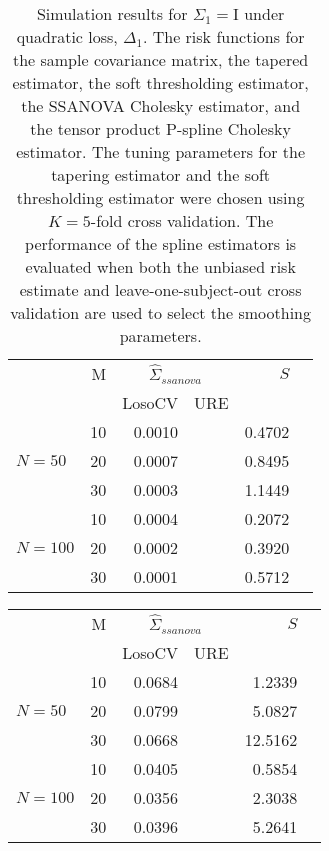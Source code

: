 \documentclass[12pt]{article}
\theoremstyle{definition}
\begin{document}
\setlength{\dashlinedash}{0.5pt}
\setlength{\dashlinegap}{1pt}
\setlength{\arrayrulewidth}{0.2pt}


\begin{table}[ht]
\caption{Simulation results for $\Sigma_1 = \mathrm{I}$ under quadratic loss, $\Delta_1$. The risk functions for the sample covariance matrix, the tapered estimator, the soft thresholding estimator, the SSANOVA Cholesky estimator, and the tensor product P-spline Cholesky estimator. The tuning parameters for the tapering estimator and the soft thresholding estimator were chosen using $K = 5$-fold cross validation. The performance of the spline estimators is evaluated when both the unbiased risk estimate and leave-one-subject-out cross validation are used to select the smoothing parameters.}
\centering
\begin{tabular}{lrrrrr}
& M & \multicolumn{2}{c}{$\hat{\Sigma}_{ssanova}$} & $S$ \\ 
& & \mbox{LosoCV} & \mbox{URE} &  \\   \hline
		&    10 & 0.0010 && 0.4702 \\ 
$N = 50$  &    20 & 0.0007 && 0.8495 \\ 
  		&    30 & 0.0003 && 1.1449 \\ \hdashline
		 &    10 & 0.0004 && 0.2072 \\ 
$N = 100$ &    20 & 0.0002 && 0.3920 \\ 
   &    30 & 0.0001 & &0.5712 \\ 
   \hline
\end{tabular}
\end{table}


\begin{table}[ht]
\centering
\begin{tabular}{lrrrrr}
& M & \multicolumn{2}{c}{$\hat{\Sigma}_{ssanova}$} & $S$ \\ 
& & \mbox{LosoCV} & \mbox{URE} &  \\   \hline
&    10 & 0.0684 & &1.2339 \\ 
$N = 50$ &    20 & 0.0799 & &5.0827 \\ 
  &    30 & 0.0668 & &12.5162 \\ 
   \hdashline
 &    10 & 0.0405 && 0.5854 \\ 
$N = 100$ &    20 & 0.0356 && 2.3038 \\ 
  &    30 & 0.0396 & &5.2641 \\ 
\end{tabular}
\end{table}
\end{document}
